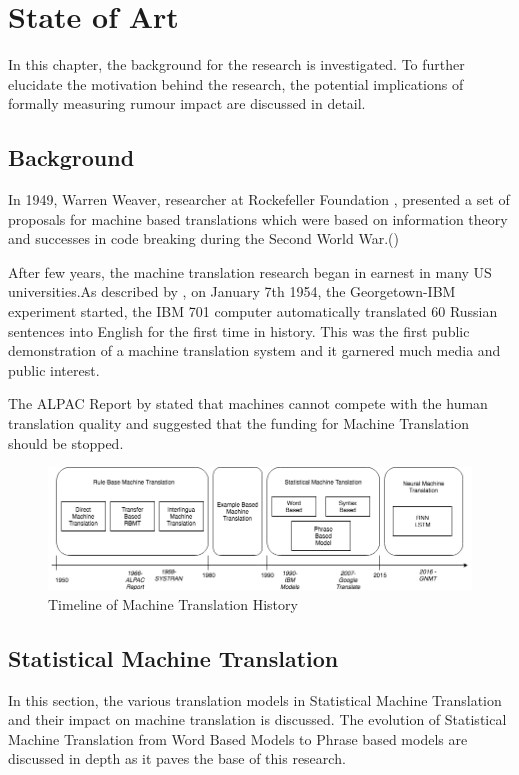 \chapter{State of Art}
In this chapter, the background for the research is investigated. To further elucidate the motivation behind the research, the potential implications of formally measuring rumour impact are discussed in detail.

\section{Background}
In 1949, Warren Weaver, researcher at Rockefeller Foundation , presented a set of proposals for machine based translations which were based on information theory and successes in code breaking during the Second World War.(\cite{Weaver})

After few years, the machine translation research began in earnest in many US universities.As described by \cite{Hutchins55thegeorgetown-i.b.m.}, on January 7th 1954, the Georgetown-IBM experiment started, the IBM 701 computer automatically translated 60 Russian sentences into English for the first time in history. This was the first public demonstration of a machine translation system and it garnered much media and public interest.  
 
The ALPAC Report by \cite{Pierce:1966:LMC:1102009} stated that machines cannot compete with the human translation quality and suggested that the funding for Machine Translation should be stopped. 

\begin{figure}[h]
\includegraphics[width=\textwidth,]{figures/timeline.png}
\caption{Timeline of Machine Translation History} \label{sbmt}
\end{figure}

\section{Statistical Machine Translation}

In this section, the various translation models in Statistical Machine Translation and their impact on machine translation is discussed. The evolution of Statistical Machine Translation from Word Based Models to Phrase based models are discussed in depth as it paves the base of this research.

